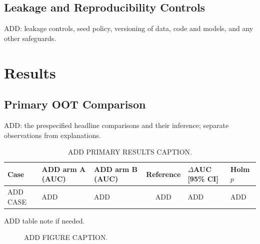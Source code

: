 \documentclass[final,5p,twocolumn]{elsarticle}
\begin{document}
\subsection{Leakage and Reproducibility Controls}
\label{subsec:leakage_controls}
ADD: leakage controls, seed policy, versioning of data, code and models, and any other safeguards.


\section{Results}
\label{sec:results}

\subsection{Primary OOT Comparison}
\label{subsec:primary_results}
ADD: the prespecified headline comparisons and their inference; separate observations from explanations.

\begin{table}[htbp]
\centering
\scriptsize
\setlength{\tabcolsep}{3pt}
\begin{threeparttable}
\caption{ADD PRIMARY RESULTS CAPTION.}
\label{tab:primary_results}
\begin{tabular}{@{}lllcll@{}}
\toprule
Case & ADD arm A (AUC) & ADD arm B (AUC) & Reference & $\Delta$AUC [95\% CI] & Holm $p$ \\
\midrule
ADD CASE & ADD & ADD & ADD & ADD & ADD \\
\bottomrule
\end{tabular}
\begin{tablenotes}\scriptsize
\item[a] ADD table note if needed.
\end{tablenotes}
\end{threeparttable}
\end{table}

\begin{figure}[htbp]
\centering
{}
\caption{ADD FIGURE CAPTION.}
\label{fig:primary}
\end{figure}
\end{document}
